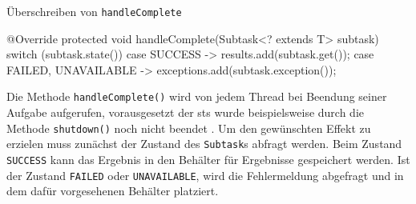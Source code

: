     \begin{program} [H]
        \caption{Überschreiben von \texttt{handleComplete}}
        \label{prog:ÜberschreibenVonHandleComplete}
    \begin{JavaCode}[language=Java, numbers=left]
@Override
protected void handleComplete(Subtask<? extends T> subtask) {
    switch (subtask.state()) {
        case SUCCESS -> results.add(subtask.get());
        case FAILED, UNAVAILABLE -> {
            exceptions.add(subtask.exception());
        }
    }
}\end{JavaCode}
    \end{program}
    Die Methode \texttt{handleComplete()} wird von jedem Thread bei Beendung seiner Aufgabe aufgerufen, vorausgesetzt der \gls{sts} wurde beispielsweise durch die Methode 
    \texttt{shut\-down()} noch nicht beendet \cite{oracle21STS}.
    Um den gewünschten Effekt zu erzielen muss zunächst der Zustand des \texttt{Subtask}s abfragt werden. Beim Zustand \texttt{SUCCESS} kann das Ergebnis in den Behälter für Ergebnisse
    gespeichert werden. Ist der Zustand \texttt{FAILED} oder \texttt{UNAVAILABLE}, wird die Fehlermeldung abgefragt und in dem dafür vorgesehenen Behälter platziert.

